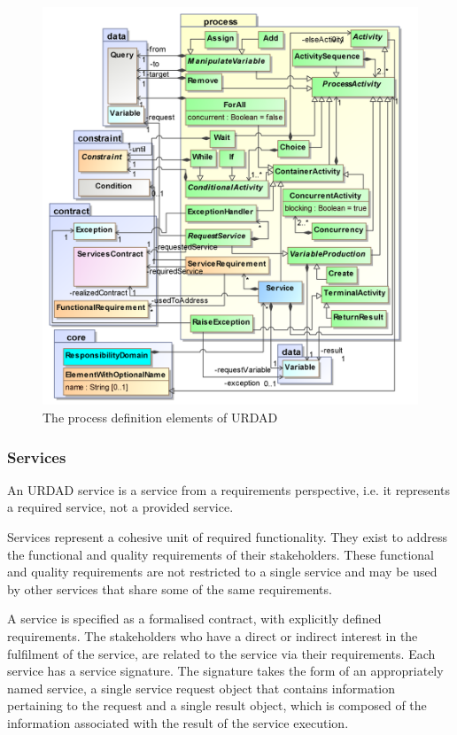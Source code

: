 \begin{figure}
  \centering
  \includegraphics{process}
  \caption{The process definition elements of URDAD}
  \label{fig:metamodel}
\end{figure}





\subsubsection{Services}

An URDAD service is a service from a requirements perspective, i.e. it represents a required service, not a provided service. 


Services represent a cohesive unit of required functionality. They exist to address the functional and quality requirements of their stakeholders. These functional and quality requirements are not restricted to a single service and may be used by other services that share some of the same requirements.

A service is specified as a formalised contract, with explicitly defined requirements. The stakeholders who have a direct or indirect interest in the fulfilment of the service, are related to the service via their requirements. Each service has a service signature. The signature takes the form of an appropriately named service, a single service request object that contains information pertaining to the request and a single result object, which is composed of the information associated with the result of the service execution.

